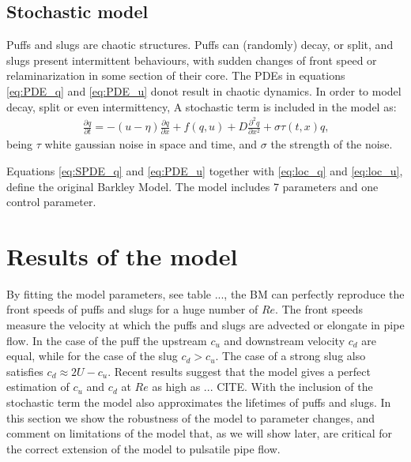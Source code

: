 \documentclass{article}
\begin{document}
\subsection{Stochastic model}
Puffs and slugs are chaotic structures. Puffs can (randomly) decay, or split, and slugs present intermittent behaviours, with sudden changes of front speed or relaminarization in some section of their core. The PDEs in equations \ref{eq:PDE_q} and \ref{eq:PDE_u} donot result in chaotic dynamics. In order to model decay, split or even intermittency, A stochastic term is included in the model as:
\begin{align}
\frac{\partial q}{\partial t}=-\left(u-\eta \right)\frac{\partial q}{\partial x} + f\left(q,u \right) + D\frac{\partial^{2} q}{\partial x^{2}} + \sigma \tau \left(t,x\right) q \text{,}
\label{eq:SPDE_q}
\end{align}
being $\tau$ white gaussian noise in space and time, and $\sigma$ the strength of the noise. 

Equations \ref{eq:SPDE_q} and \ref{eq:PDE_u} together with \ref{eq:loc_q} and \ref{eq:loc_u}, define the original Barkley Model. The model includes 7 parameters and one control parameter.



\section{Results of the model}
By fitting the model parameters, see table ..., the BM can perfectly reproduce the front speeds of puffs and slugs for a huge number of $Re$. The front speeds measure the velocity at which the puffs and slugs are advected or elongate in pipe flow. In the case of the puff the upstream $c_{u}$ and downstream velocity $c_{d}$ are equal, while for the case of the slug $c_{d}>c_{u}$. The case of a strong slug also satisfies $c_{d}\approx 2U-c_{u}$. Recent results suggest that the model gives a perfect estimation of $c_{u}$ and $c_{d}$ at $Re$ as high as ... CITE. With the inclusion of the stochastic term the model also approximates the lifetimes of puffs and slugs. In this section we show the robustness of the model to parameter changes, and comment on limitations of the model that, as we will show later, are critical for the correct extension of the model to pulsatile pipe flow. 

\end{document}
